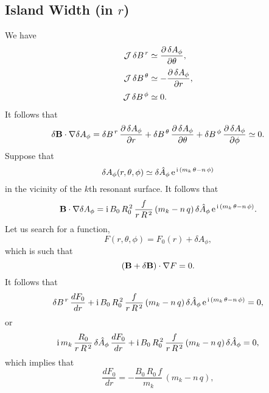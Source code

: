 \documentclass[12pt]{article}
\begin{document}
\subsection{Island Width (in $r$)}
We have
\begin{align}
{\cal J}\,\delta B^{\,r} &\simeq \frac{\partial \,\delta A_\phi}{\partial\theta},\\[0.5ex]
{\cal J}\,\delta B^{\,\theta} &\simeq -\frac{\partial\,\delta A_\phi}{\partial r},\\[0.5ex]
{\cal J}\,\delta B^{\,\phi} &\simeq 0.
\end{align}
It follows that
\begin{equation}
\delta {\bf B}\cdot\nabla\delta A_\phi = \delta B^{\,r}\,\frac{\partial\,\delta A_\phi}{\partial r}+  \delta B^{\,\theta}\,\frac{\partial\,\delta A_\phi}{\partial \theta}+  \delta B^{\,\phi}\,\frac{\partial\,\delta A_\phi}{\partial \phi}\simeq 0. 
\end{equation}
Suppose that
\begin{equation}
\delta A_\phi (r,\theta,\phi)\simeq \delta \hat{A}_\phi\,{\rm e}^{\,{\rm i}\,(
m_k\,\theta - n\,\phi)}
\end{equation}
in the vicinity of the $k$th resonant surface. It follows that
\begin{equation}
{\bf B}\cdot\nabla \delta A_\phi = {\rm i}\,B_0\,R_0^{\,2}\,\frac{f}{r\,R^{\,2}}\,(m_k-n\,q)\,\delta\hat{A}_\phi\,{\rm e}^{\,{\rm i}\,(
m_k\,\theta - n\,\phi)}.
\end{equation}
Let us search for a function,
\begin{equation}
F(r,\theta,\phi)= F_0(r) + \delta A_\phi,
\end{equation}
which is such that
\begin{equation}
({\bf B}+\delta {\bf B})\cdot\nabla F = 0.
\end{equation}
It follows that
\begin{equation}
\delta B^{\,r}\,\frac{dF_0}{dr} +{\rm i}\,B_0\,R_0^{\,2}\,\frac{f}{r\,R^{\,2}}\,(m_k-n\,q)\,\delta\hat{A}_\phi\,{\rm e}^{\,{\rm i}\,(m_k\,\theta - n\,\phi)}=0,
\end{equation}
or
\begin{equation}
{\rm i}\,m_k\,\frac{R_0}{r\,R^{\,2}}\,\delta \hat{A}_\phi \,\frac{dF_0}{dr}+{\rm i}\,B_0\,R_0^{\,2}\,\frac{f}{r\,R^{\,2}}\,(m_k-n\,q)\,\delta\hat{A}_\phi=0,
\end{equation}
which implies that
\begin{equation}
\frac{dF_0}{dr} = -\frac{B_0\,R_0\,f}{m_k}\,(m_k-n\,q),
\end{equation}
\end{document}
